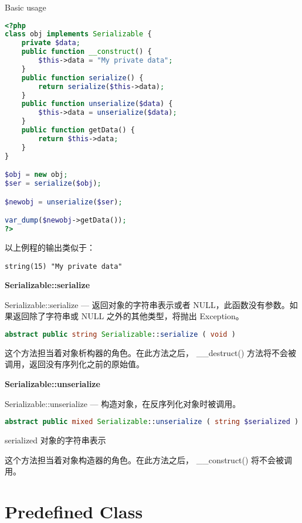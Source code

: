 \begin{example}
Basic usage
\begin{lstlisting}[language=PHP]
<?php
class obj implements Serializable {
    private $data;
    public function __construct() {
        $this->data = "My private data";
    }
    public function serialize() {
        return serialize($this->data);
    }
    public function unserialize($data) {
        $this->data = unserialize($data);
    }
    public function getData() {
        return $this->data;
    }
}

$obj = new obj;
$ser = serialize($obj);

$newobj = unserialize($ser);

var_dump($newobj->getData());
?>
\end{lstlisting}
\end{example}


以上例程的输出类似于：

\begin{verbatim}
string(15) "My private data"
\end{verbatim}


\textbf{Serializable::serialize}

Serializable::serialize — 返回对象的字符串表示或者 NULL，此函数没有参数。如果返回除了字符串或 NULL 之外的其他类型，将抛出 Exception。


\begin{lstlisting}[language=PHP]
abstract public string Serializable::serialize ( void )
\end{lstlisting}

这个方法担当着对象析构器的角色。在此方法之后， \_\_destruct() 方法将不会被调用，返回没有序列化之前的原始值。


\textbf{Serializable::unserialize}

Serializable::unserialize — 构造对象，在反序列化对象时被调用。

\begin{lstlisting}[language=PHP]
abstract public mixed Serializable::unserialize ( string $serialized )
\end{lstlisting}

\begin{compactitem}
\item serialized
对象的字符串表示
\end{compactitem}

这个方法担当着对象构造器的角色。在此方法之后， \_\_construct() 将不会被调用。


\chapter{Predefined Class}

